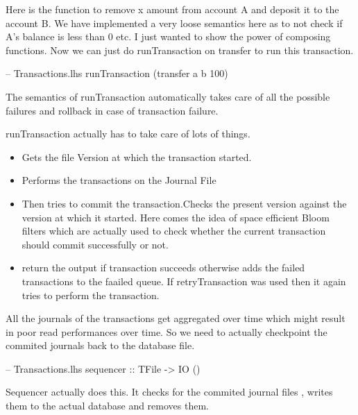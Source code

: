 \documentclass[11pt,a4paper]{article}
\begin{document}
Here is the function to remove x amount from account A and deposit it to
the account B. We have implemented a very loose semantics here as to not
check if A's balance is less than 0 etc. I just wanted to show the power
of composing functions. Now we can just do runTransaction on transfer to
run this transaction. \\
\begin{code}[name=Transactions]
-- Transactions.lhs
runTransaction (transfer a b 100)
\end{code}
The semantics of runTransaction automatically
takes care of all the possible failures and rollback in case of
transaction failure.

runTransaction actually has to take care of lots of things. 
\begin{itemize}
\item Gets the file Version at which the transaction started.
\item Performs the transactions on the Journal File 
\item Then tries to commit the transaction.Checks the present version against the version at which it started. Here comes the idea of space efficient Bloom filters which are actually used to check whether the current transaction should commit successfully or not. 
\item return the output if transaction succeeds otherwise adds the failed transactions to the faailed queue. If retryTransaction was used then it again tries to perform the transaction. 
\end{itemize}
All the journals of the transactions get aggregated over time which might result in poor read performances over time. So we need to actually checkpoint the commited journals back to the database file. \\
\begin{code}[name=Transactions]
-- Transactions.lhs
sequencer :: TFile -> IO () 
\end{code}
Sequencer actually does this. It checks for the commited journal files , writes them to the actual database and removes them. 
\end{document}
